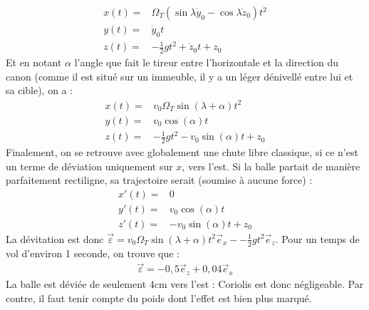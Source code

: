 \documentclass{report}
\begin{document}
\begin{itemize}
\begin{align*}
        x(t)=& \Omega_T(\sin\lambda\dot{y}_0-\cos\lambda\dot{z}_0)t^2\\ 
        y(t)=&\dot{y}_0t \\
        z(t)=&-\frac{1}{2} gt^2 + \dot{z}_0t+z_0
	\end{align*}	
Et en notant $\alpha$ l'angle que fait le tireur entre l'horizontale et la direction du canon (comme il est situé sur un immeuble, il y a un léger dénivellé entre lui et sa cible), on a :
	\begin{align*}
        x(t)=& v_0\Omega_T\sin(\lambda+\alpha)t^2\\ 
        y(t)=&v_0\cos(\alpha)t \\
        z(t)=&-\frac{1}{2} gt^2 -v_0\sin(\alpha)t+z_0
	\end{align*}	
Finalement, on se retrouve avec globalement une chute libre classique, si ce n'est un terme de déviation uniquement sur $x$, vers l'est. Si la balle partait de manière parfaitement rectiligne, sa trajectoire serait (soumise à aucune force) :
	\begin{align*}
        x'(t)=& 0\\ 
        y'(t)=&v_0\cos(\alpha)t \\
        z'(t)=& -v_0\sin(\alpha)t+z_0
	\end{align*}	
La dévitation est donc $\vec{\varepsilon	}=v_0\Omega_T\sin(\lambda+\alpha)t^2\vec{e}_x--\frac{1}{2} gt^2\vec{e}_z$. Pour un temps de vol d'environ 1 seconde, on trouve que :
\begin{align*}
	\vec{\varepsilon}=-0,5\vec{e}_z+0,04\vec{e}_x
\end{align*}
La balle est déviée de seulement 4cm vers l'est : Coriolis est donc négligeable. Par contre, il faut tenir compte du poids dont l'effet est bien plus marqué. 
	
\end{itemize}
\end{document}
